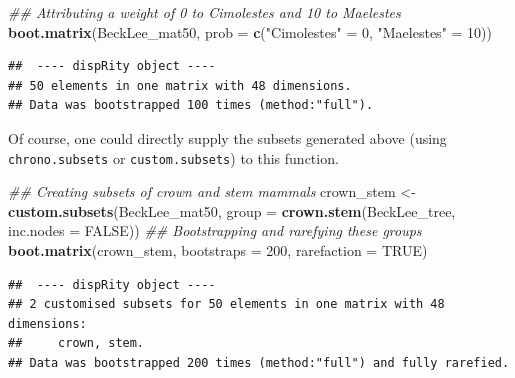 \documentclass[
]{book}
\newenvironment{Shaded}{\begin{snugshade}}{\end{snugshade}}
\newcommand{\CommentTok}[1]{\textcolor[rgb]{0.56,0.35,0.01}{\textit{#1}}}
\newcommand{\DataTypeTok}[1]{\textcolor[rgb]{0.13,0.29,0.53}{#1}}
\newcommand{\DecValTok}[1]{\textcolor[rgb]{0.00,0.00,0.81}{#1}}
\newcommand{\KeywordTok}[1]{\textcolor[rgb]{0.13,0.29,0.53}{\textbf{#1}}}
\newcommand{\NormalTok}[1]{#1}
\newcommand{\OtherTok}[1]{\textcolor[rgb]{0.56,0.35,0.01}{#1}}
\newcommand{\StringTok}[1]{\textcolor[rgb]{0.31,0.60,0.02}{#1}}
\begin{document}
\begin{Shaded}
\begin{Highlighting}[]
\CommentTok{\#\# Attributing a weight of 0 to Cimolestes and 10 to Maelestes}
\KeywordTok{boot.matrix}\NormalTok{(BeckLee\_mat50,}
            \DataTypeTok{prob =} \KeywordTok{c}\NormalTok{(}\StringTok{"Cimolestes"}\NormalTok{ =}\StringTok{ }\DecValTok{0}\NormalTok{, }\StringTok{"Maelestes"}\NormalTok{ =}\StringTok{ }\DecValTok{10}\NormalTok{))}
\end{Highlighting}
\end{Shaded}

\begin{verbatim}
##  ---- dispRity object ---- 
## 50 elements in one matrix with 48 dimensions.
## Data was bootstrapped 100 times (method:"full").
\end{verbatim}

Of course, one could directly supply the subsets generated above (using \texttt{chrono.subsets} or \texttt{custom.subsets}) to this function.

\begin{Shaded}
\begin{Highlighting}[]
\CommentTok{\#\# Creating subsets of crown and stem mammals}
\NormalTok{crown\_stem \textless{}{-}}\StringTok{ }\KeywordTok{custom.subsets}\NormalTok{(BeckLee\_mat50,}
                             \DataTypeTok{group =} \KeywordTok{crown.stem}\NormalTok{(BeckLee\_tree,}
                                                \DataTypeTok{inc.nodes =} \OtherTok{FALSE}\NormalTok{))}
\CommentTok{\#\# Bootstrapping and rarefying these groups}
\KeywordTok{boot.matrix}\NormalTok{(crown\_stem, }\DataTypeTok{bootstraps =} \DecValTok{200}\NormalTok{, }\DataTypeTok{rarefaction =} \OtherTok{TRUE}\NormalTok{)}
\end{Highlighting}
\end{Shaded}

\begin{verbatim}
##  ---- dispRity object ---- 
## 2 customised subsets for 50 elements in one matrix with 48 dimensions:
##     crown, stem.
## Data was bootstrapped 200 times (method:"full") and fully rarefied.
\end{verbatim}
\end{document}
